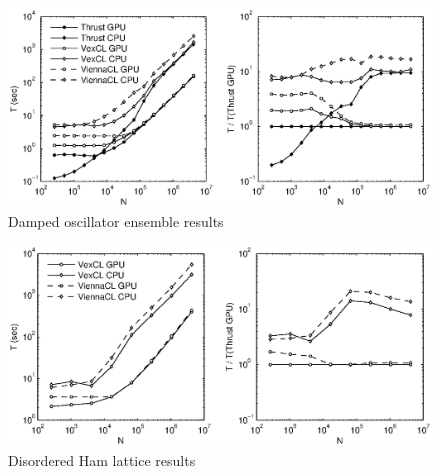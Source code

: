\documentclass[1p]{elsarticle}
\begin{document}
\begin{figure}[p]
    \begin{center}
        \includegraphics[width=\textwidth]{data/damped_oscillator/perfcmp}
    \end{center}
    \caption{Damped oscillator ensemble results}
    \label{fig:damped:perf}
\end{figure}

\begin{figure}[p]
    \begin{center}
        \includegraphics[width=\textwidth]{data/disordered_ham_lattice/perfcmp}
    \end{center}
    \caption{Disordered Ham lattice results}
    \label{fig:lattice:perf}
\end{figure}
\end{document}
